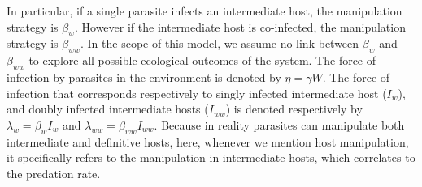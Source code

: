 \documentclass[11pt]{article}
\begin{document}
In particular, if a single parasite infects an intermediate host, the manipulation strategy is $\beta_w$. 
However if the intermediate host is co-infected, the manipulation strategy is $\beta_{ww}$. 
In the scope of this model, we assume no link between $\beta_w$ and $\beta_{ww}$ to explore all possible ecological outcomes of the system. 
The force of infection by parasites in the environment is denoted by $\eta = \gamma W$. 
The force of infection that corresponds respectively to singly infected intermediate host ($I_w$), and doubly infected intermediate hosts ($I_{ww}$) is denoted respectively by $\lambda_w = \beta_w I_w$ and $\lambda_{ww} = \beta_{ww} I_{ww}$. Because in reality parasites can manipulate both intermediate and definitive hosts, here, whenever we mention host manipulation, it specifically refers to the manipulation in intermediate hosts, which correlates to the predation rate.
\end{document}
